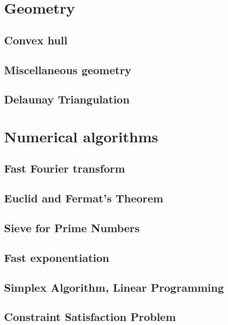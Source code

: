 \section{Geometry}
\subsection{Convex hull}
\raggedbottom
\hrulefill
\subsection{Miscellaneous geometry}
\raggedbottom
\hrulefill
\subsection{Delaunay Triangulation}
\raggedbottom
\hrulefill

\section{Numerical algorithms}
\subsection{Fast Fourier transform}
\raggedbottom
\hrulefill
\subsection{Euclid and Fermat's Theorem}
\raggedbottom
\hrulefill
\subsection{Sieve for Prime Numbers}
\raggedbottom
\hrulefill
\subsection{Fast exponentiation}
\raggedbottom
\hrulefill
\subsection{Simplex Algorithm, Linear Programming}
\raggedbottom
\hrulefill
\subsection{Constraint Satisfaction Problem}
\raggedbottom
\hrulefill

